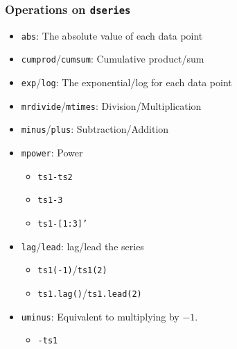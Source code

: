 \documentclass[10pt]{beamer}
\begin{document}
\begin{frame}[fragile,t]
  \frametitle{Operations on \texttt{dseries}}
  \begin{itemize}
  \item \texttt{abs}: The absolute value of each data point
  \item \texttt{cumprod}/\texttt{cumsum}: Cumulative product/sum
  \item \texttt{exp}/\texttt{log}: The exponential/log for each data point
  \item \texttt{mrdivide}/\texttt{mtimes}: Division/Multiplication
  \item \texttt{minus}/\texttt{plus}: Subtraction/Addition
  \item \texttt{mpower}: Power
    \begin{itemize}
    \item \texttt{ts1-ts2}
    \item \texttt{ts1-3}
    \item \texttt{ts1-[1:3]'}
    \end{itemize}
  \item \texttt{lag}/\texttt{lead}: lag/lead the series
    \begin{itemize}
    \item \texttt{ts1(-1)}/\texttt{ts1(2)}
    \item \texttt{ts1.lag()}/\texttt{ts1.lead(2)}
    \end{itemize}
  \item \texttt{uminus}: Equivalent to multiplying by $-1$.
    \begin{itemize}
    \item \texttt{-ts1}
    \end{itemize}
  \end{itemize}
\end{frame}
\end{document}
